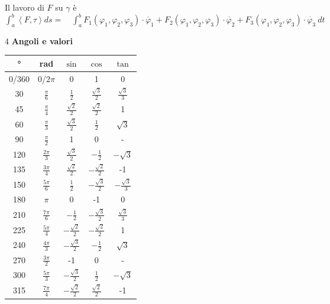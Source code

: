 \documentclass[a4paper, oneside]{article}
\begin{document}
    Il lavoro di $F$ su $\gamma$ è $    \int_{a}^{b} \left\langle F,\tau \right\rangle ds = \quad     \int_{a}^{b} F_1(\varphi_1, \varphi_2, \varphi_3) \cdot \dot{\varphi_1} + F_2(\varphi_1, \varphi_2, \varphi_3) \cdot \dot{\varphi_2} + F_3(\varphi_1, \varphi_2, \varphi_3) \cdot \dot{\varphi_3} \ dt $
\begin{multicols}{4}
    \noindent
    \textbf{Angoli e valori}\\
    \begin{tabular}{|c|c|c|c|c|}
        \hline
        \textbf{°} & \textbf{rad} & \textbf{$\sin$} & \textbf{$\cos$} & \textbf{$\tan$} \\
        \hline
        0/360 & 0/$2\pi$ & 0 & 1 & 0\\
        \hline
        30 & $\frac{\pi}{6}$ & $\frac{1}{2}$ & $\frac{\sqrt{3}}{2}$ & $\frac{\sqrt{3}}{3}$ \\
        \hline
        45 & $\frac{\pi}{4}$ & $\frac{\sqrt{2}}{2}$ & $\frac{\sqrt{2}}{2}$ & 1 \\
        \hline
        60 & $\frac{\pi}{3}$ & $\frac{\sqrt{3}}{2}$ & $\frac{1}{2}$ & $\sqrt{3}$ \\
        \hline
        90 & $\frac{\pi}{2}$ & 1 & 0 & - \\
        \hline
        120 & $\frac{2\pi}{3}$ & $\frac{\sqrt{3}}{2}$ & $-\frac{1}{2}$ & $-\sqrt{3}$ \\
        \hline
        135 & $\frac{3\pi}{4}$ & $\frac{\sqrt{2}}{2}$ & $-\frac{\sqrt{2}}{2}$ & -1 \\
        \hline
        150 & $\frac{5\pi}{6}$ & $\frac{1}{2}$ & $-\frac{\sqrt{3}}{2}$ & $-\frac{\sqrt{3}}{3}$ \\
        \hline
        180 & $\pi$ & 0 & -1 & 0 \\
        \hline
        210 & $\frac{7\pi}{6}$ & $-\frac{1}{2}$ & $-\frac{\sqrt{3}}{2}$ & $\frac{\sqrt{3}}{3}$ \\
        \hline
        225 & $\frac{5\pi}{4}$ & $-\frac{\sqrt{2}}{2}$ & $-\frac{\sqrt{2}}{2}$ & 1 \\
        \hline
        240 & $\frac{4\pi}{3}$ & $-\frac{\sqrt{3}}{2}$ & $-\frac{1}{2}$ & $\sqrt{3}$ \\
        \hline
        270 & $\frac{3\pi}{2}$ & -1 & 0 & - \\
        \hline
        300 & $\frac{5\pi}{3}$ & $-\frac{\sqrt{3}}{2}$ & $\frac{1}{2}$ & $-\sqrt{3}$ \\
        \hline
        315 & $\frac{7\pi}{4}$ & $-\frac{\sqrt{2}}{2}$ & $\frac{\sqrt{2}}{2}$ & -1 \\

\end{tabular}
\end{multicols}
\end{document}
